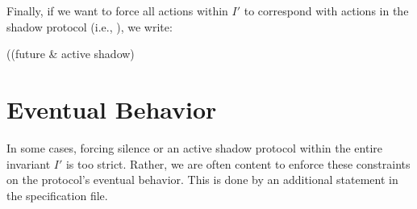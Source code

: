 Finally, if we want to force all actions within $I'$ to correspond with actions in the shadow protocol (i.e., ), we write:
\begin{code}
((future & active shadow) %
\end{code}

\section{Eventual Behavior}

In some cases, forcing silence or an active shadow protocol within the entire invariant $I'$ is too strict.
Rather, we are often content to enforce these constraints on the protocol's eventual behavior.
This is done by an additional statement in the specification  file.
